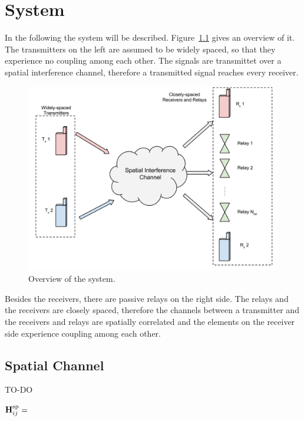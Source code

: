 \chapter{System}
\label{sec:system}

In the following the system will be described.
Figure~\ref{fig:system} gives an overview of it.
The transmitters on the left are assumed to be widely spaced, so that they experience no coupling among each other.
The signals are transmittet over a spatial interference channel, therefore a transmitted signal reaches every receiver.
\begin{figure}[h]
\begin{center}
\includegraphics[width=\textwidth]{images/System.png}
\caption{Overview of the system.}
\label{fig:system}
\end{center}
\end{figure}

Besides the receivers, there are passive relays on the right side.
The relays and the receivers are closely spaced, therefore the channels between a transmitter and the receivers and relays are spatially correlated and the elements on the receiver side experience coupling among each other.

\section{Spatial Channel}
\label{sec:spatial}

TO-DO

$\mathbf{H}_{ij}^{\text{sp}} = $ 


